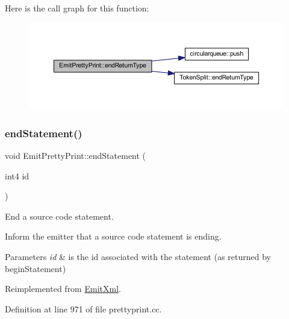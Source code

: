 Here is the call graph for this function\+:
\nopagebreak
\begin{figure}[H]
\begin{center}
\leavevmode
\includegraphics[width=350pt]{class_emit_pretty_print_a4ea26b7a3fad1f933665392fa682f4b1_cgraph}
\end{center}
\end{figure}
\mbox{\label{class_emit_pretty_print_ab19e4ce2f8b1028e41d217d6c762ef7a}} 
\subsubsection{\texorpdfstring{endStatement()}{endStatement()}}
{\footnotesize\ttfamily void Emit\+Pretty\+Print\+::end\+Statement (\begin{DoxyParamCaption}\item[{int4}]{id }\end{DoxyParamCaption})\hspace{0.3cm}{\ttfamily [virtual]}}



End a source code statement. 

Inform the emitter that a source code statement is ending. 
\begin{DoxyParams}{Parameters}
{\em id} & is the id associated with the statement (as returned by begin\+Statement) \\
\hline
\end{DoxyParams}


Reimplemented from \mbox{\hyperlink{class_emit_xml_a179b45bd8929a464f8fbc622de96f399}{Emit\+Xml}}.



Definition at line 971 of file prettyprint.\+cc.


